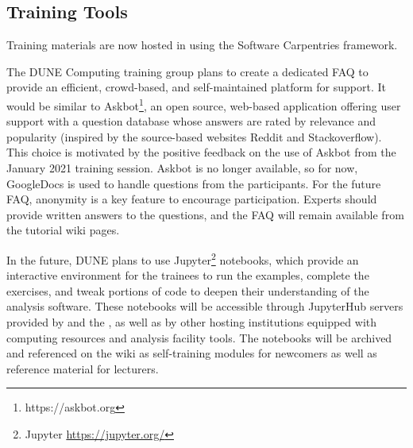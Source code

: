 \documentclass[../main-v1.tex]{subfiles}
\begin{document}
\subsection{Training Tools}
Training materials are now hosted in  using the Software Carpentries framework. 


The DUNE Computing training group plans to create a dedicated FAQ to provide an efficient, crowd-based, and self-maintained platform for support. It would be similar to Askbot\footnote{https://askbot.org}, an open source, web-based application offering user support with a question database whose answers are rated by relevance and popularity (inspired by the source-based websites Reddit and Stackoverflow). This choice is motivated by the positive feedback on the use of Askbot from the January 2021 training session.  Askbot is no longer available, so for now, GoogleDocs is used %
to %
handle questions from the participants. For the future FAQ, anonymity is a key feature to encourage participation. %
Experts %
should  provide written answers to the questions, and the FAQ will remain available from %
the tutorial wiki pages. %

In the future, DUNE %
plans to use Jupyter\footnote{Jupyter\textcopyright{} \url{https://jupyter.org/}} notebooks, %
which provide an interactive environment for the trainees to run the examples, complete the exercises, and tweak portions of code to deepen their understanding of the analysis software. %
These notebooks will be accessible through %
JupyterHub servers provided by  and the , as well as by other hosting institutions equipped with computing resources and analysis facility tools. The notebooks will be archived and referenced on the wiki as self-training modules for newcomers as well as %
reference material for %
lecturers.
\end{document}
